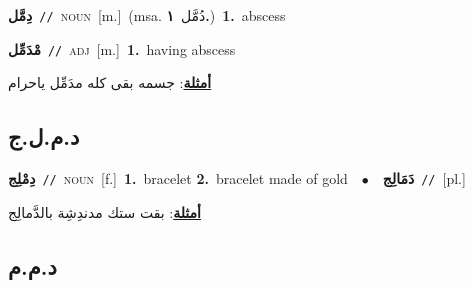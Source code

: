 \documentclass[10pt,a4paper,twoside]{article} %
\begin{document}
\begin{multicols}{2}
{\setlength\topsep{0pt}\textbf{\foreignlanguage{arabic}{دِمَّل}}\ {\color{gray}\texttt{//}\color{black}}\ \textsc{noun}\ [m.]\ \color{gray}(msa. \foreignlanguage{arabic}{دُمَّل}~\foreignlanguage{arabic}{\textbf{١.}})\color{black}\ \textbf{1.}~abscess\ } \vspace{2mm}

{\setlength\topsep{0pt}\textbf{\foreignlanguage{arabic}{مْدَمِّل}}\ {\color{gray}\texttt{//}\color{black}}\ \textsc{adj}\ [m.]\ \textbf{1.}~having abscess\  \begin{flushright}\color{gray}\foreignlanguage{arabic}{\textbf{\underline{\foreignlanguage{arabic}{أمثلة}}}: جسمه بقى كله مدَمِّل ياحرام}\end{flushright}\color{black}} \vspace{2mm}

\vspace{-3mm}
\subsection*{\color{blue}\foreignlanguage{arabic}{د.م.ل.ج}\color{blue}{}} 

{\setlength\topsep{0pt}\textbf{\foreignlanguage{arabic}{دِمْلِج}}\ {\color{gray}\texttt{//}\color{black}}\ \textsc{noun}\ [f.]\ \textbf{1.}~bracelet  \textbf{2.}~bracelet made of gold\ \ $\bullet$\ \ \setlength\topsep{0pt}\textbf{\foreignlanguage{arabic}{دَمَالِج}}\ {\color{gray}\texttt{//}\color{black}}\ [pl.]\  \begin{flushright}\color{gray}\foreignlanguage{arabic}{\textbf{\underline{\foreignlanguage{arabic}{أمثلة}}}: بقت ستك مدندِشِة بالدَّمالِج}\end{flushright}\color{black}} \vspace{2mm}

\vspace{-3mm}
\subsection*{\color{blue}\foreignlanguage{arabic}{د.م.م}\color{blue}{}} 


\end{multicols}
\end{document}
